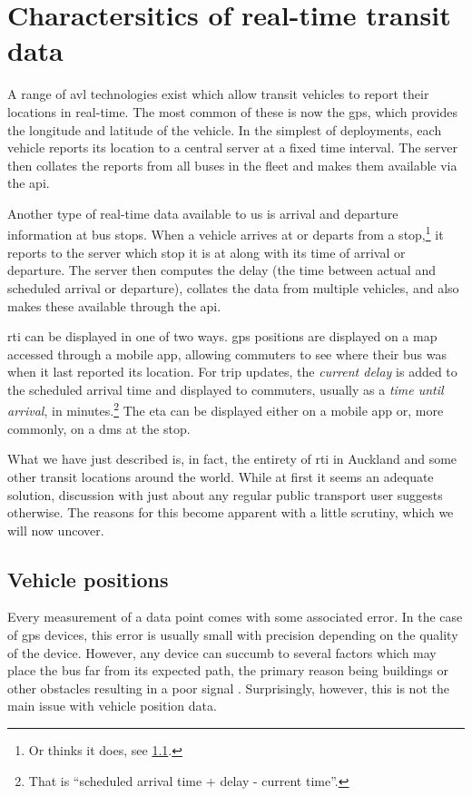 \section{Charactersitics of real-time transit data}
\label{sec:realtime-data}

A range of \gls{avl} technologies exist which allow transit vehicles to report their locations in real-time. The most common of these is now the \gls{gps}, which provides the longitude and latitude of the vehicle. In the simplest of deployments, each vehicle reports its location to a central server at a fixed time interval. The server then collates the reports from all buses in the fleet and makes them available via the \gls{api}.


Another type of real-time data available to us is arrival and departure information at bus stops. When a vehicle arrives at or departs from a stop,\footnote{Or thinks it does, see \cref{sec:vp_data}.} it reports to the server which stop it is at along with its time of arrival or departure. The server then computes the delay (the time between actual and scheduled arrival or departure), collates the data from multiple vehicles, and also makes these available through the \gls{api}.


\Gls{rti} can be displayed in one of two ways. \Gls{gps} positions are displayed on a map accessed through a mobile app, allowing commuters to see where their bus was when it last reported its location. For trip updates, the \emph{current delay} is added to the scheduled arrival time and displayed to commuters, usually as a \emph{time until arrival}, in minutes.\footnote{That is ``scheduled arrival time + delay - current time''.} The \gls{eta} can be displayed either on a mobile app or, more commonly, on a \gls{dms} at the stop.


What we have just described is, in fact, the entirety of \gls{rti} in Auckland and some other transit locations around the world. While at first it seems an adequate solution, discussion with just about any regular public transport user suggests otherwise. The reasons for this become apparent with a little scrutiny, which we will now uncover.


\subsection{Vehicle positions}
\label{sec:vp_data}

Every measurement of a data point comes with some associated error. In the case of \gls{gps} devices, this error is usually small with precision depending on the quality of the device. However, any device can succumb to several factors which may place the bus far from its expected path, the primary reason being buildings or other obstacles resulting in a poor signal \citep{Xinghao_2013,Mutambara_2000,Zhao_1997}. Surprisingly, however, this is not the main issue with vehicle position data.


